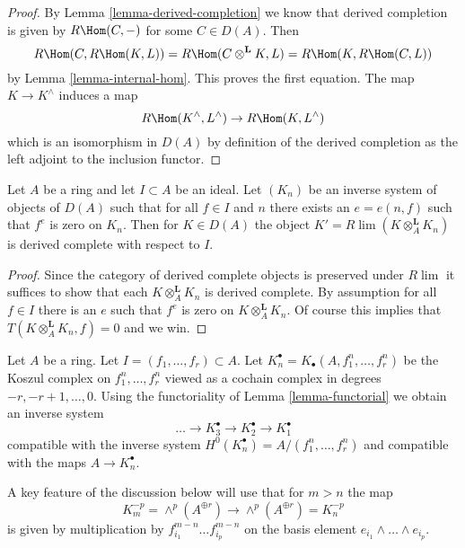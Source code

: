 \begin{proof}
By Lemma \ref{lemma-derived-completion} we know that derived completion is
given by $R\Hom(C, -)$ for some $C \in D(A)$. Then
$$
R\Hom(C, R\Hom(K, L)) = R\Hom(C \otimes^\mathbf{L} K, L) =
R\Hom(K, R\Hom(C, L))
$$
by Lemma \ref{lemma-internal-hom}. This proves the first equation.
The map $K \to K^\wedge$ induces a map
$$
R\Hom(K^\wedge, L^\wedge) \to R\Hom(K, L^\wedge)
$$
which is an isomorphism in $D(A)$ by definition of the derived completion
as the left adjoint to the inclusion functor.
\end{proof}

\begin{lemma}
\label{lemma-naive-derived-completion}
Let $A$ be a ring and let $I \subset A$ be an ideal. Let $(K_n)$ be an inverse
system of objects of $D(A)$ such that for all $f \in I$ and $n$
there exists an $e = e(n, f)$ such that $f^e$ is zero on $K_n$.
Then for $K \in D(A)$ the object $K' = R\lim (K \otimes_A^\mathbf{L} K_n)$
is derived complete with respect to $I$.
\end{lemma}

\begin{proof}
Since the category of derived complete objects is preserved under $R\lim$
it suffices to show that each $K \otimes_A^\mathbf{L} K_n$ is derived
complete. By assumption for all $f \in I$ there is an $e$ such
that $f^e$ is zero on $K \otimes_A^\mathbf{L} K_n$. Of course this
implies that $T(K \otimes_A^\mathbf{L} K_n, f) = 0$ and we win.
\end{proof}

\begin{situation}
\label{situation-koszul}
Let $A$ be a ring. Let $I = (f_1, \ldots, f_r) \subset A$. Let
$K_n^\bullet = K_\bullet(A, f_1^n, \ldots, f_r^n)$
be the Koszul complex on $f_1^n, \ldots, f_r^n$
viewed as a cochain complex in degrees $-r, -r + 1, \ldots, 0$.
Using the functoriality of Lemma \ref{lemma-functorial}
we obtain an inverse system
$$
\ldots \to K_3^\bullet \to K_2^\bullet \to K_1^\bullet
$$
compatible with the inverse system
$H^0(K_n^\bullet) = A/(f_1^n, \ldots, f_r^n)$
and compatible with the maps $A \to K_n^\bullet$.
\end{situation}

\noindent
A key feature of the discussion below will use that for $m > n$ the map
$$
K_m^{-p} = \wedge^p(A^{\oplus r}) \to \wedge^p(A^{\oplus r}) = K_n^{-p}
$$
is given by multiplication by $f_{i_1}^{m - n} \ldots f_{i_p}^{m - n}$
on the basis element $e_{i_1} \wedge \ldots \wedge e_{i_p}$.

